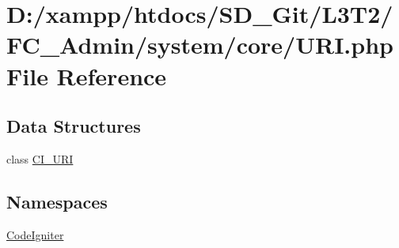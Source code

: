 \hypertarget{system_2core_2_u_r_i_8php}{}\section{D\+:/xampp/htdocs/\+S\+D\+\_\+\+Git/\+L3\+T2/\+F\+C\+\_\+\+Admin/system/core/\+U\+R\+I.php File Reference}
\label{system_2core_2_u_r_i_8php}
\subsection*{Data Structures}
\begin{DoxyCompactItemize}
\item 
class \hyperlink{class_c_i___u_r_i}{C\+I\+\_\+\+U\+R\+I}
\end{DoxyCompactItemize}
\subsection*{Namespaces}
\begin{DoxyCompactItemize}
\item 
 \hyperlink{namespace_code_igniter}{Code\+Igniter}
\end{DoxyCompactItemize}
